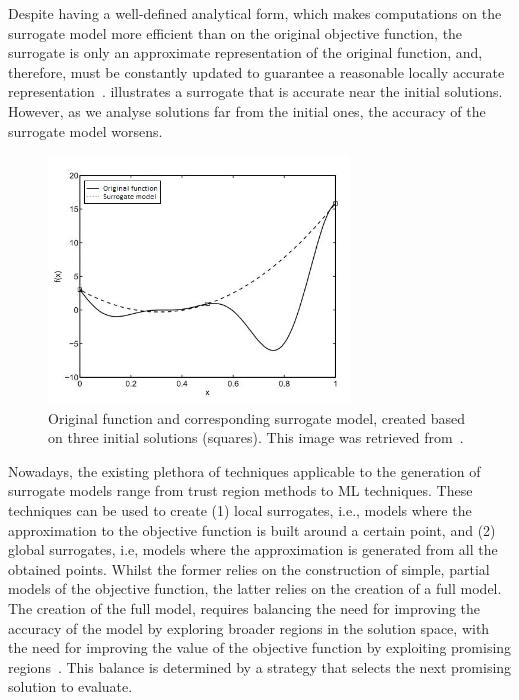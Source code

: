 	Despite having a well-defined analytical form, which makes computations on the surrogate model more efficient than on the original objective function, the surrogate is only an approximate representation of the original function, and, therefore, must be constantly updated to guarantee a reasonable locally accurate representation~\cite{Koziel2011}.  illustrates a surrogate that is accurate near the initial solutions. However, as we analyse solutions far from the initial ones, the accuracy of the surrogate model worsens.
	
	\begin{figure}
		\centering
		\includegraphics[width=8cm]{Images/Background/sbosexample.JPG}
		\caption[Example of a surrogate model]{Original function and corresponding surrogate model, created based on three initial solutions (squares). This image was retrieved from~\cite{Koziel2011}.}
		\label{fig:sbosexample}
	\end{figure}
	
	Nowadays, the existing plethora of techniques applicable to the generation of surrogate models range from trust region methods to \ac{ML} techniques. These techniques can be used to create (1) local surrogates, i.e., models where the approximation to the objective function is built around a certain point, and (2) global surrogates, i.e, models where the approximation is generated from all the obtained points. Whilst the former relies on the construction of simple, partial models of the objective function, the latter relies on the creation of a full model. The creation of the full model, requires balancing the need for improving the accuracy of the model by exploring broader regions in the solution space, with the need for improving the value of the objective function by exploiting promising regions~\cite{Koziel2011}. This balance is determined by a strategy that selects the next promising solution to evaluate.
	
